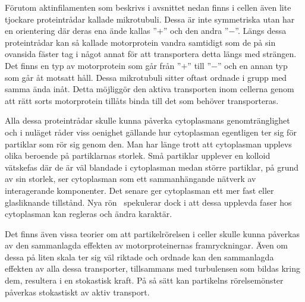 Förutom aktinfilamenten som beskrivs i avsnittet nedan finns i cellen även lite tjockare proteintrådar kallade mikrotubuli. Dessa är inte symmetriska utan har en orientering där deras ena ände kallas ''$+$'' och den andra ''$-$''. Längs dessa proteintrådar kan så kallade motorprotein vandra samtidigt som de på sin ovansida fäster tag i något annat för att transportera detta längs med strängen. Det finns en typ av motorprotein som går från ''$+$'' till ''$-$'' och en annan typ som går åt motsatt håll. Dessa mikrotubuli sitter oftast ordnade i grupp med samma ända inåt. Detta möjliggör den aktiva transporten inom cellerna genom att rätt sorts motorprotein tillåts binda till det som behöver transporteras. 


Alla dessa proteintrådar skulle kunna påverka cytoplasmans genomtränglighet och i nuläget råder viss oenighet gällande hur cytoplasman egentligen ter sig för partiklar som rör sig genom den. Man har länge trott att cytoplasman upplevs olika beroende på partiklarnas storlek. Små partiklar upplever en kolloid vätskefas där de är väl blandade i cytoplasman medan större partiklar, på grund av sin storlek, ser cytoplasman som ett sammanhängande nätverk av interagerande komponenter. Det senare ger cytoplasman ett mer fast eller glasliknande tillstånd. Nya rön~\cite{Parry_etal2014} spekulerar dock i att dessa upplevda faser hos cytoplasman kan regleras och ändra karaktär.

Det finns även vissa teorier om att partikelrörelsen i celler skulle kunna påverkas av den sammanlagda effekten av motorproteinernas framryckningar. Även om dessa på liten skala ter sig väl riktade och ordnade kan den sammanlagda effekten av alla dessa transporter, tillsammans med turbulensen som bildas kring dem, resultera i en stokastisk kraft. På så sätt kan partikelns rörelsemönster påverkas stokastiskt av aktiv transport. 

